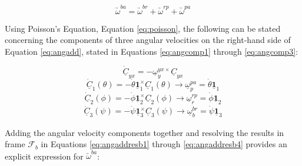 \documentclass[journal]{IEEEtran}
\begin{document}
\begin{equation}
	\underrightarrow{\omega}^{ba}=\underrightarrow{\omega}^{br}+\underrightarrow{\omega}^{rp}+\underrightarrow{\omega}^{pa}
	\label{eq:angadd}
\end{equation}

Using Poisson's Equation, Equation \ref{eq:poisson}, the following can be stated concerning the components of three angular velocities on the right-hand side of Equation \ref{eq:angadd}, stated in Equations \ref{eq:angcomp1} through \ref{eq:angcomp3}:

\begin{equation}
	\underline{\dot{C}}_{yx}=-\underline{\omega}^{yx\times}_y\underline{C}_{yx}
	\label{eq:poisson}
\end{equation}
\begin{equation}
	\underline{\dot{C}}_1(\theta)=-\dot{\theta}\underline{\mathbf{1}}^{\times}_1\underline{C}_1(\theta) \xrightarrow[]{} \underline{\omega}^{pa}_p=\dot{\theta}\underline{\mathbf{1}}_1
	\label{eq:angcomp1}
\end{equation}
\begin{equation}
	\underline{\dot{C}}_2(\phi)=-\dot{\phi}\underline{\mathbf{1}}^{\times}_2\underline{C}_2(\phi) \xrightarrow[]{} \underline{\omega}^{rp}_r=\dot{\phi}\underline{\mathbf{1}}_2
	\label{eq:angcomp2}
\end{equation}
\begin{equation}
	\underline{\dot{C}}_3(\psi)=-\dot{\psi}\underline{\mathbf{1}}^{\times}_3\underline{C}_3(\psi) \xrightarrow[]{} \underline{\omega}^{br}_b=\dot{\psi}\underline{\mathbf{1}}_3
	\label{eq:angcomp3}
\end{equation}

Adding the angular velocity components together and resolving the results in frame $\mathcal{F}_b$ in Equations \ref{eq:angaddresb1} through \ref{eq:angaddresb4} provides an explicit expression for $\underrightarrow{\omega}^{ba}$:
\end{document}
